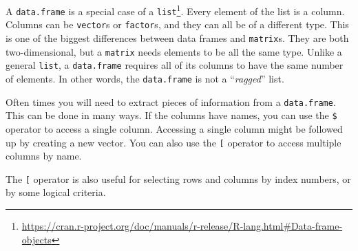 \documentclass[
  12pt,
  krantz2]{krantz}
\makeatletter
\newenvironment{Shaded}{\begin{snugshade}}{\end{snugshade}}
\newcommand{\DecValTok}[1]{\textcolor[rgb]{0.06,0.06,0.06}{#1}}
\newcommand{\DocumentationTok}[1]{\textcolor[rgb]{0.37,0.37,0.37}{\textbf{\textit{#1}}}}
\newcommand{\FunctionTok}[1]{\textcolor[rgb]{0,0,0}{#1}}
\newcommand{\NormalTok}[1]{#1}
\newcommand{\OtherTok}[1]{\textcolor[rgb]{0.37,0.37,0.37}{#1}}
\newcommand{\SpecialCharTok}[1]{\textcolor[rgb]{0,0,0}{#1}}
\newcommand{\StringTok}[1]{\textcolor[rgb]{0.5,0.5,0.5}{#1}}
\renewcommand{\href}[2]{#2\footnote{\url{#1}}}
\newenvironment{kframe}{%
\medskip{}
\setlength{\fboxsep}{.8em}
 \def\at@end@of@kframe{}%
 \ifinner\ifhmode%
  \def\at@end@of@kframe{\end{minipage}}%
  \begin{minipage}{\columnwidth}%
 \fi\fi%
 \def\FrameCommand##1{\hskip\@totalleftmargin \hskip-\fboxsep
 \colorbox{shadecolor}{##1}\hskip-\fboxsep
     \hskip-\linewidth \hskip-\@totalleftmargin \hskip\columnwidth}%
 \MakeFramed {\advance\hsize-\width
   \@totalleftmargin\z@ \linewidth\hsize
   \@setminipage}}%
 {\par\unskip\endMakeFramed%
 \at@end@of@kframe}
\renewenvironment{Shaded}{\begin{kframe}}{\end{kframe}}
\makeatother
\begin{document}
\href{https://cran.r-project.org/doc/manuals/r-release/R-lang.html\#Data-frame-objects}{A \texttt{data.frame} is a special case of a \texttt{list}}. Every element of the list is a column. Columns can be \texttt{vector}s or \texttt{factor}s, and they can all be of a different type. This is one of the biggest differences between data frames and \texttt{matrix}s. They are both two-dimensional, but a \texttt{matrix} needs elements to be all the same type. Unlike a general \texttt{list}, a \texttt{data.frame} requires all of its columns to have the same number of elements. In other words, the \texttt{data.frame} is not a ``\emph{ragged}'' list.

Often times you will need to extract pieces of information from a \texttt{data.frame}. This can be done in many ways. If the columns have names, you can use the \texttt{\$} operator to access a single column. Accessing a single column might be followed up by creating a new vector. You can also use the \texttt{{[}} operator to access multiple columns by name.

\begin{Shaded}
\end{Shaded}

The \texttt{{[}} operator is also useful for selecting rows and columns by index numbers, or by some logical criteria.
\end{document}
